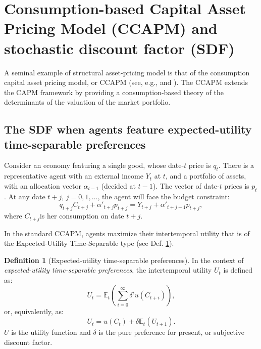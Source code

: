 \documentclass[
  12pt,
]{book}
\theoremstyle{definition}
\newtheorem{definition}{Definition}[chapter]
\theoremstyle{definition}
\theoremstyle{definition}
\theoremstyle{definition}
\theoremstyle{remark}
\begin{document}
\hypertarget{PricingEquilibrium}{%
\section{Consumption-based Capital Asset Pricing Model (CCAPM) and stochastic discount factor (SDF)}\label{PricingEquilibrium}}

A seminal example of structural asset-pricing model is that of the consumption capital asset pricing model, or CCAPM (see, e.g., \citet{Merton_1973} and \citet{BREEDEN1979265}). The CCAPM extends the CAPM framework by providing a consumption-based theory of the determinants of the valuation of the market portfolio.

\hypertarget{the-sdf-when-agents-feature-expected-utility-time-separable-preferences}{%
\subsection{The SDF when agents feature expected-utility time-separable preferences}\label{the-sdf-when-agents-feature-expected-utility-time-separable-preferences}}

Consider an economy featuring a single good, whose date-\(t\) price is \(q_t\). There is a representative agent with an external income \(Y_t\) at \(t\), and a portfolio of assets, with an allocation vector \(\alpha_{t-1}\) (decided at \(t-1\)). The vector of date-\(t\) prices is \(p_t\). At any date \(t+j\), \(j=0,1,\dots\), the agent will face the budget constraint:
\begin{equation}
q_{t+j}C_{t+j}+\alpha'_{t+j}p_{t+j} = Y_{t+j} +
\alpha'_{t+j-1}p_{t+j},\label{eq:BConstr}
\end{equation}
where \(C_{t+j}\)is her consumption on date \(t+j\).

In the standard CCAPM, agents maximize their intertemporal utility that is of the Expected-Utility Time-Separable type (see Def. \ref{def:EUTSpref}).

\begin{definition}[Expected-utility time-separable preferences]
\protect\hypertarget{def:EUTSpref}{}\label{def:EUTSpref}In the context of \emph{expected-utility time-separable preferences}, the intertemporal utility \(U_t\) is defined as:
\[
U_t = \mathbb{E}_t\left(\sum_{i=0}^{\infty} \delta^{i}u(C_{t+i})\right),
\]
or, equivalently, as:
\[
U_t = u(C_t) + \delta \mathbb{E}_t\left(U_{t+1}\right).
\]
\(U\) is the utility function and \(\delta\) is the pure preference for present, or subjective discount factor.
\end{definition}
\end{document}
